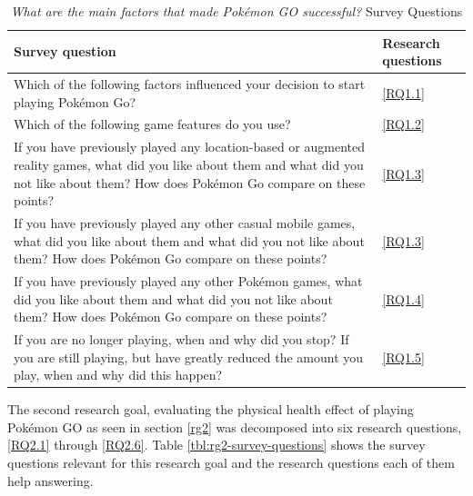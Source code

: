 \begin{table}[h]
	\caption{\emph{What are the main factors that made Pokémon GO successful?} Survey Questions}
	\centering
	\label{tbl:rg1-survey-questions}
	\begin{tabularx}{\textwidth}{|X|l|}
		\hline
		\textbf{Survey question} & \textbf{Research questions}\\
		\hline\hline
		
		Which of the following factors influenced your decision to start playing Pokémon Go? & \ref{RQ1.1}\\
		\hline
		
		Which of the following game features do you use? & \ref{RQ1.2}\\
		\hline
		
		If you have previously played any location-based or augmented reality games, what did you like about them and what did you not like about them? How does Pokémon Go compare on these points? & \ref{RQ1.3}\\
		\hline
		
		If you have previously played any other casual mobile games, what did you like about them and what did you not like about them? How does Pokémon Go compare on these points? & \ref{RQ1.3}\\
		\hline
		
		If you have previously played any other Pokémon games, what did you like about them and what did you not like about them? How does Pokémon Go compare on these points? & \ref{RQ1.4}\\
		\hline
		
		If you are no longer playing, when and why did you stop? If you are still playing, but have greatly reduced the amount you play, when and why did this happen? & \ref{RQ1.5}\\
		\hline
	\end{tabularx}
\end{table}

The second research goal, evaluating the physical health effect of playing Pokémon GO as seen in section \ref{rg2} was decomposed into six research questions, \ref{RQ2.1} through \ref{RQ2.6}. Table \ref{tbl:rg2-survey-questions} shows the survey questions relevant for this research goal and the research questions each of them help answering.

